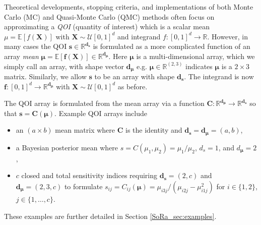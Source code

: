 \documentclass[graybox]{svmult}
\begin{document}
Theoretical developments, stopping criteria, and implementations of both Monte Carlo (MC) and Quasi-Monte Carlo (QMC) methods often focus on approximating a \emph{QOI} (quantity of interest) which is a scalar mean  $\mu = \mathbb{E}[f(\boldsymbol{X})]$ with $\boldsymbol{X} \sim \mathcal{U}[0,1]^d$ and integrand $f: [0,1]^d \to \mathbb{R}$. However, in many cases the QOI $\boldsymbol{s} \in \mathbb{R}^{\boldsymbol{d}_{\boldsymbol{s}}}$ is formulated as a more complicated function of an array \emph{mean} $\boldsymbol{\mu} = \mathbb{E}[\boldsymbol{f}(\boldsymbol{X})] \in \mathbb{R}^{\boldsymbol{d}_{\boldsymbol{\mu}}}$. Here $\boldsymbol{\mu}$ is a multi-dimensional array, which we simply call an array, with shape vector $\boldsymbol{d}_{\boldsymbol{\mu}}$ e.g. $\boldsymbol{\mu} \in \mathbb{R}^{(2,3)}$ indicates $\boldsymbol{\mu}$ is a $2 \times 3$ matrix. Similarly, we allow $\boldsymbol{s}$ to be an array with shape $\boldsymbol{d}_{\boldsymbol{s}}$. The integrand is now $\boldsymbol{f}: [0,1]^{d} \to \mathbb{R}^{\boldsymbol{d}_{\boldsymbol{\mu}}}$ with $\boldsymbol{X} \sim \mathcal{U}[0,1]^d$ as before. 

The QOI array is formulated from the mean array via a function $\boldsymbol{C}: \mathbb{R}^{\boldsymbol{d}_{\boldsymbol{\mu}}} \to \mathbb{R}^{\boldsymbol{d}_{\boldsymbol{s}}}$ so that $\boldsymbol{s} = \boldsymbol{C}(\boldsymbol{\mu})$.
Example QOI arrays include
\begin{itemize}
    \item an $(a \times b)$ mean matrix where $\boldsymbol{C}$ is the identity and $\boldsymbol{d}_{\boldsymbol{s}} = \boldsymbol{d}_{\boldsymbol{\mu}} = (a,b)$,
    \item a Bayesian posterior mean where $s = C(\mu_1,\mu_2) = \mu_1/\mu_2$, $d_s = 1$, and $d_{\boldsymbol{\mu}} = 2$, 
    \item $c$ closed and total sensitivity indices requiring $\boldsymbol{d}_{\boldsymbol{s}} = (2,c)$ and $\boldsymbol{d}_{\boldsymbol{\mu}} = (2,3,c)$ to formulate $s_{ij} = C_{ij}(\boldsymbol{\mu}) =  \mu_{i3j}/(\mu_{i2j}-\mu_{i1j}^2)$ for $i \in \{1,2\}$, $j \in \{1,\dots,c\}$.
\end{itemize}
These examples are further detailed in Section \ref{SoRa_sec:examples}.
\end{document}
